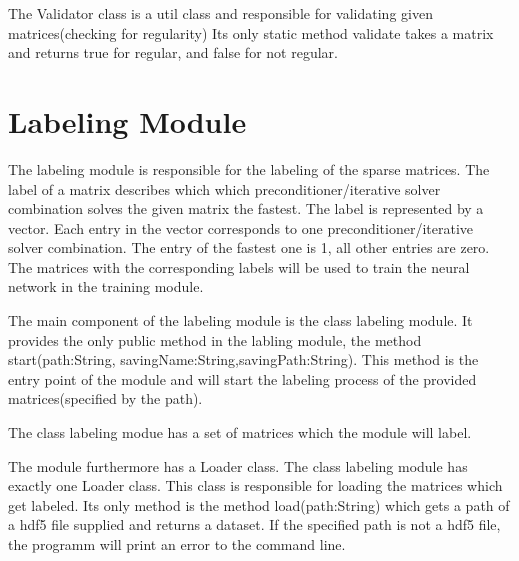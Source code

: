 \documentclass[parskip=full]{scrartcl}
\begin{document}
The Validator class is a util class and responsible for validating given matrices(checking for regularity)
 Its only static method validate takes a matrix and returns true for regular, and false for not regular.

\section{Labeling Module}
The labeling module is responsible for the labeling of the sparse matrices. The label of a matrix describes which which \gls{preconditioner}/\gls{iterative solver} combination solves the given matrix the fastest. The label is represented by a vector. Each entry in the vector corresponds to one \gls{preconditioner}/\gls{iterative solver} combination. The entry of the fastest one is 1, all other entries are zero. The matrices with the corresponding labels will be used to train the neural network in the training module.

The main component of the labeling module is the class labeling module. It provides the only public method in the labling module, the method start(path:String, savingName:String,savingPath:String). This method is the entry point of the module and will start the labeling process of the provided matrices(specified by the path). \newline\newline

The class labeling modue has a set of matrices which the module will label.\newline\newline

The module furthermore has a Loader class. The class labeling module has exactly one Loader class. This class is responsible for loading the matrices which get labeled. Its only method is the method load(path:String) which gets a path of a hdf5 file supplied and returns a dataset. If the specified path is not a hdf5 file, the programm will print an error to the command line. \newline\newline
\end{document}
